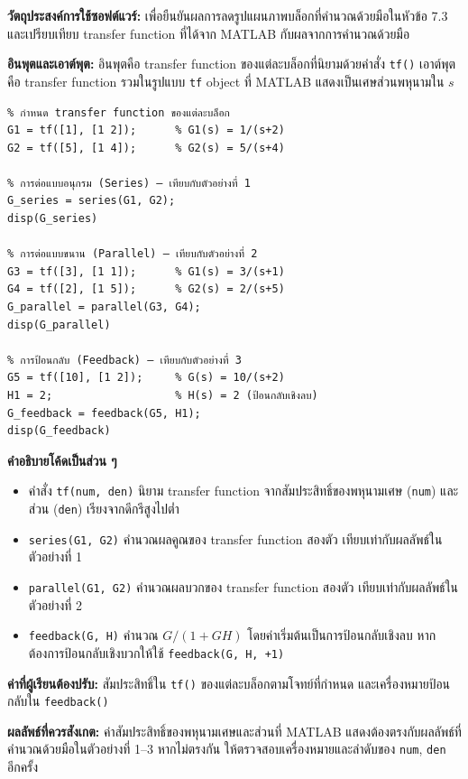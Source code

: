 \textbf{วัตถุประสงค์การใช้ซอฟต์แวร์:} เพื่อยืนยันผลการลดรูปแผนภาพบล็อกที่คำนวณด้วยมือในหัวข้อ 7.3 และเปรียบเทียบ transfer function ที่ได้จาก MATLAB กับผลจากการคำนวณด้วยมือ

\textbf{อินพุตและเอาต์พุต:} อินพุตคือ transfer function ของแต่ละบล็อกที่นิยามด้วยคำสั่ง \texttt{tf()} เอาต์พุตคือ transfer function รวมในรูปแบบ \texttt{tf} object ที่ MATLAB แสดงเป็นเศษส่วนพหุนามใน $s$

\begin{verbatim}
% กำหนด transfer function ของแต่ละบล็อก
G1 = tf([1], [1 2]);      % G1(s) = 1/(s+2)
G2 = tf([5], [1 4]);      % G2(s) = 5/(s+4)

% การต่อแบบอนุกรม (Series) — เทียบกับตัวอย่างที่ 1
G_series = series(G1, G2);
disp(G_series)

% การต่อแบบขนาน (Parallel) — เทียบกับตัวอย่างที่ 2
G3 = tf([3], [1 1]);      % G1(s) = 3/(s+1)
G4 = tf([2], [1 5]);      % G2(s) = 2/(s+5)
G_parallel = parallel(G3, G4);
disp(G_parallel)

% การป้อนกลับ (Feedback) — เทียบกับตัวอย่างที่ 3
G5 = tf([10], [1 2]);     % G(s) = 10/(s+2)
H1 = 2;                   % H(s) = 2 (ป้อนกลับเชิงลบ)
G_feedback = feedback(G5, H1);
disp(G_feedback)
\end{verbatim}

\textbf{คำอธิบายโค้ดเป็นส่วน ๆ}

\begin{itemize}
    \item คำสั่ง \texttt{tf(num, den)} นิยาม transfer function จากสัมประสิทธิ์ของพหุนามเศษ (\texttt{num}) และส่วน (\texttt{den}) เรียงจากดีกรีสูงไปต่ำ
    \item \texttt{series(G1, G2)} คำนวณผลคูณของ transfer function สองตัว เทียบเท่ากับผลลัพธ์ในตัวอย่างที่ 1
    \item \texttt{parallel(G1, G2)} คำนวณผลบวกของ transfer function สองตัว เทียบเท่ากับผลลัพธ์ในตัวอย่างที่ 2
    \item \texttt{feedback(G, H)} คำนวณ $G/(1+GH)$ โดยค่าเริ่มต้นเป็นการป้อนกลับเชิงลบ หากต้องการป้อนกลับเชิงบวกให้ใช้ \texttt{feedback(G, H, +1)}
\end{itemize}

\textbf{ค่าที่ผู้เรียนต้องปรับ:} สัมประสิทธิ์ใน \texttt{tf()} ของแต่ละบล็อกตามโจทย์ที่กำหนด และเครื่องหมายป้อนกลับใน \texttt{feedback()}

\textbf{ผลลัพธ์ที่ควรสังเกต:} ค่าสัมประสิทธิ์ของพหุนามเศษและส่วนที่ MATLAB แสดงต้องตรงกับผลลัพธ์ที่คำนวณด้วยมือในตัวอย่างที่ 1–3 หากไม่ตรงกัน ให้ตรวจสอบเครื่องหมายและลำดับของ \texttt{num}, \texttt{den} อีกครั้ง

